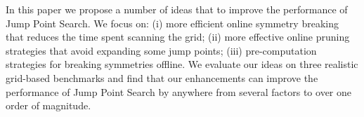 In this paper we propose a number of ideas that to improve the
performance of Jump Point Search. We focus on: (i) more efficient online 
symmetry breaking that reduces the time spent scanning the grid; 
(ii) more effective online pruning strategies that avoid expanding some jump
points; (iii) pre-computation strategies for breaking symmetries offline.
We evaluate our ideas on three realistic grid-based benchmarks and
find that our enhancements can improve the performance of Jump Point Search
by anywhere from several factors to over one order of magnitude. 



